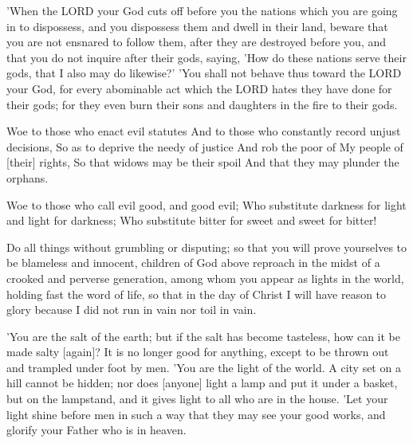 \begin{scripture}[Deuteronomy 12:29-31]
    'When the LORD your God cuts off before you the nations which you are going in to dispossess, and you dispossess them and dwell in their land,
    beware that you are not ensnared to follow them, after they are destroyed before you, and that you do not inquire after their gods, saying, 'How do these nations serve their gods, that I also may do likewise?'
    'You shall not behave thus toward the LORD your God, for every abominable act which the LORD hates they have done for their gods; for they even burn their sons and daughters in the fire to their gods.
\end{scripture}

\begin{scripture}[Isaiah 10:1-2]
    Woe to those who enact evil statutes And to those who constantly record unjust decisions,
    So as to deprive the needy of justice And rob the poor of My people of [their] rights, So that widows may be their spoil And that they may plunder the orphans.
\end{scripture}

\begin{scripture}[Isaiah 5:20]
    Woe to those who call evil good, and good evil; Who substitute darkness for light and light for darkness; Who substitute bitter for sweet and sweet for bitter!
\end{scripture}

\begin{scripture}[Philippians 2:14-16]
    Do all things without grumbling or disputing;
    so that you will prove yourselves to be blameless and innocent, children of God above reproach in the midst of a crooked and perverse generation, among whom you appear as lights in the world,
    holding fast the word of life, so that in the day of Christ I will have reason to glory because I did not run in vain nor toil in vain.
\end{scripture}

\begin{scripture}[Matthew 5:13-16]
    'You are the salt of the earth; but if the salt has become tasteless, how can it be made salty [again]? It is no longer good for anything, except to be thrown out and trampled under foot by men.
    'You are the light of the world. A city set on a hill cannot be hidden;
    nor does [anyone] light a lamp and put it under a basket, but on the lampstand, and it gives light to all who are in the house.
    'Let your light shine before men in such a way that they may see your good works, and glorify your Father who is in heaven.
\end{scripture}

